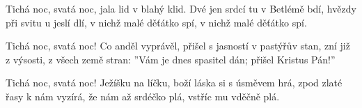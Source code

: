 \vskip-5mm
\IncludeLilypond

Tichá noc, svatá noc,
jala lid v blahý klid.
Dvé jen srdcí tu v Betlémě bdí,
hvězdy při svitu u jeslí dlí,
v nichž malé děťátko spí,
v nichž malé děťátko spí.

Tichá noc, svatá noc!
Co anděl vyprávěl,
přišel s jasností v pastýřův stan,
zní již z výsosti, z všech země stran:
''Vám je dnes spasitel dán;
přišel Kristus Pán!''

Tichá noc, svatá noc!
Ježíšku na líčku,
boží láska si s úsměvem hrá,
zpod zlaté řasy k nám vyzírá,
že nám až srdéčko plá,
vstříc mu vděčně plá.
